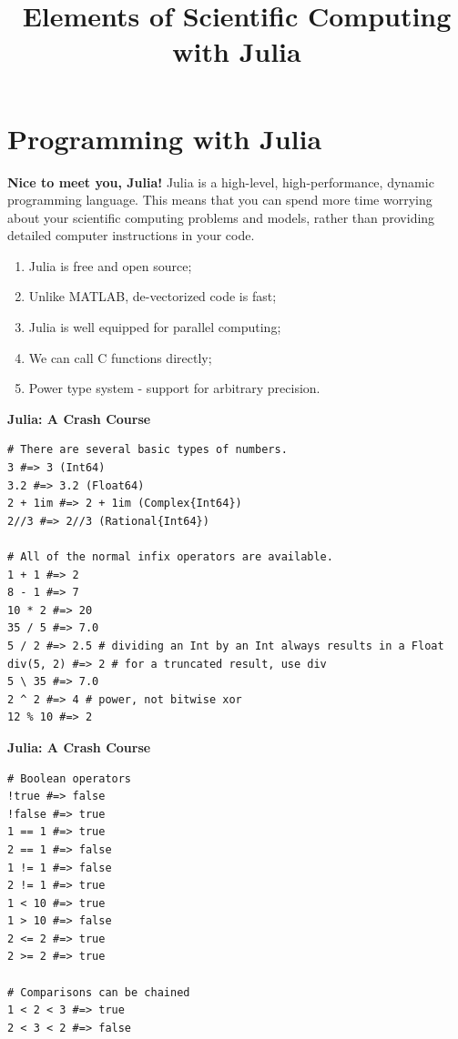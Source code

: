 \documentclass[xcolor=dvipsnames]{beamer}
\title[Scientific Computing]{Elements of Scientific Computing with Julia}
\begin{document}
\begin{frame}
\titlepage
\end{frame}

\section{Programming with Julia}
\begin{frame}[fragile]
{\bf Nice to meet you, Julia!}
Julia is a high-level, high-performance, dynamic programming language. This means that you can spend more time worrying about your scientific computing problems and models, rather than providing detailed computer instructions in your code.
\vfill
\pause
\begin{enumerate}
\item Julia is free and open source;\pause
\item Unlike MATLAB, de-vectorized code is fast;\pause
\item Julia is well equipped for parallel computing;\pause
\item We can call C functions directly;\pause
\item Power type system - support for arbitrary precision.
\end{enumerate}
\end{frame}

\begin{frame}[fragile]
{\bf Julia: A Crash Course}
\begin{lstlisting}
# There are several basic types of numbers.
3 #=> 3 (Int64)
3.2 #=> 3.2 (Float64)
2 + 1im #=> 2 + 1im (Complex{Int64})
2//3 #=> 2//3 (Rational{Int64})

# All of the normal infix operators are available.
1 + 1 #=> 2
8 - 1 #=> 7
10 * 2 #=> 20
35 / 5 #=> 7.0
5 / 2 #=> 2.5 # dividing an Int by an Int always results in a Float
div(5, 2) #=> 2 # for a truncated result, use div
5 \ 35 #=> 7.0
2 ^ 2 #=> 4 # power, not bitwise xor
12 % 10 #=> 2
\end{lstlisting}
\end{frame}

\begin{frame}[fragile]
{\bf Julia: A Crash Course}
\begin{lstlisting}
# Boolean operators
!true #=> false
!false #=> true
1 == 1 #=> true
2 == 1 #=> false
1 != 1 #=> false
2 != 1 #=> true
1 < 10 #=> true
1 > 10 #=> false
2 <= 2 #=> true
2 >= 2 #=> true

# Comparisons can be chained
1 < 2 < 3 #=> true
2 < 3 < 2 #=> false
\end{lstlisting}
\end{frame}
\end{document}
